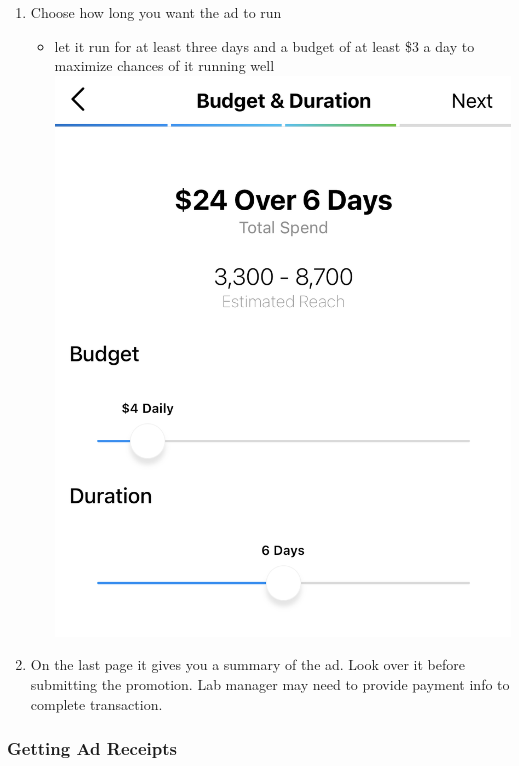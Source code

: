 \documentclass[]{book}
\providecommand{\tightlist}{%
  \setlength{\itemsep}{0pt}\setlength{\parskip}{0pt}}
\begin{document}
\begin{enumerate}
\def\labelenumi{\arabic{enumi}.}
\setcounter{enumi}{5}
\item
  Choose how long you want the ad to run

  \begin{itemize}
  \tightlist
  \item
    let it run for at least three days and a budget of at least \$3 a day to maximize chances of it running well
    \includegraphics{images/lab_protocols/ig_ads/5.png}
  \end{itemize}
\item
  On the last page it gives you a summary of the ad. Look over it before submitting the promotion. Lab manager may need to provide payment info to complete transaction.
\end{enumerate}

\hypertarget{getting-ad-receipts}{%
\subsubsection{\texorpdfstring{\textbf{Getting Ad Receipts}}{Getting Ad Receipts}}\label{getting-ad-receipts}}
\end{document}

